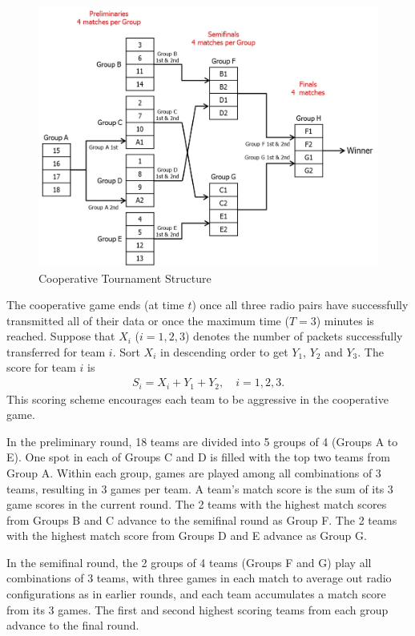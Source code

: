 \begin{figure}[tpb]
  \begin{center}
    \centerline{\includegraphics[width=170mm]{CooperativeTournamentStructure.jpg}}
    \caption{Cooperative Tournament Structure}
    \label{fig:CooperativeTournamentStructure}
  \end{center}
\end{figure}

The cooperative game ends (at time $t$) once all three radio pairs have successfully transmitted all of their data or once the maximum time ($T = 3$) minutes is reached. Suppose that $X_i$ ($i=1,2,3$) denotes the number of packets successfully transferred for team $i$. Sort $X_i$ in descending order to get $Y_1$, $Y_2$ and $Y_3$. The score for team $i$ is
\begin{align}
{S_i} = {X_i} + {Y_1} + {Y_2}, \quad i=1,2,3.
\end{align}
This scoring scheme encourages each team to be aggressive in the cooperative game.

In the preliminary round, 18 teams are divided into 5 groups of 4 (Groups A to E). One spot in each of Groups C and D is filled with the top two teams from Group A. Within each group, games are played among all combinations of 3 teams, resulting in 3 games per team. A team's match score is the sum of its 3 game scores in the current round. The 2 teams with the highest match scores from Groups B and C advance to the semifinal round as Group F. The 2 teams with the highest match score from Groups D and E advance as Group G.

In the semifinal round, the 2 groups of 4 teams (Groups F and G) play all combinations of 3 teams, with three games in each match to average out radio configurations as in earlier rounds, and each team accumulates a match score from its 3 games. The first and second highest scoring teams from each group advance to the final round.

